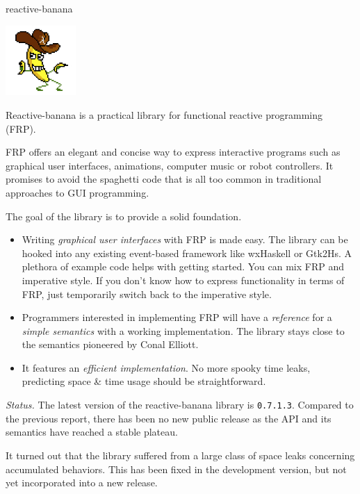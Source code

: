 \begin{hcarentry}[updated]{reactive-banana}
\makeheader

\begin{center}
\includegraphics[width=0.2\textwidth]{html/banana.jpg}
\end{center}

Reactive-banana is a practical library for functional reactive programming (FRP).

FRP offers an elegant and concise way to express interactive programs such as graphical user interfaces, animations, computer music or robot controllers. It promises to avoid the spaghetti code that is all too common in traditional approaches to GUI programming.

The goal of the library is to provide a solid foundation.
\begin{itemize}
\item Writing \emph{graphical user interfaces} with FRP is made easy. The library can be hooked into any existing event-based framework like wxHaskell or Gtk2Hs. A plethora of example code helps with getting started. You can mix FRP and imperative style. If you don't know how to express functionality in terms of FRP, just temporarily switch back to the imperative style.
\item Programmers interested in implementing FRP will have a \emph{reference} for a \emph{simple semantics} with a working implementation. The library stays close to the semantics pioneered by Conal Elliott.
\item It features an \emph{efficient implementation}. No more spooky time leaks, predicting space \& time usage should be straightforward.
\end{itemize}

\emph{Status.} The latest version of the reactive-banana library is \verb!0.7.1.3!. Compared to the previous report, there has been no new public release as the API and its semantics have reached a stable plateau.

It turned out that the library suffered from a large class of space leaks concerning accumulated behaviors. This has been fixed in the development version, but not yet incorporated into a new release.


\end{hcarentry}
